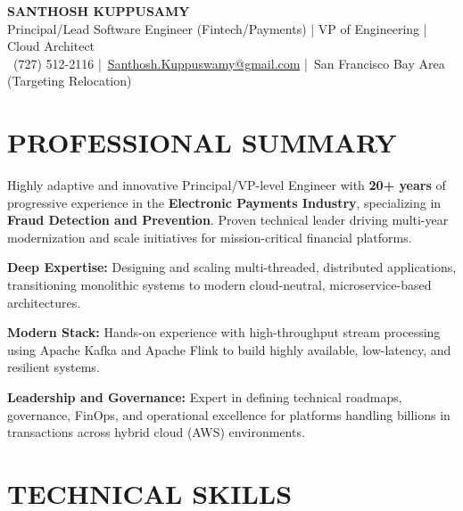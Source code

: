 \documentclass[10pt,letterpaper]{article}
\newcommand{\resumeheader}[5]{
  \begin{center}
    {\Huge\bfseries\color{headercolor}#1}\\[4pt]
    {\large\color{gray}#2}\\[6pt]
    \small
    \faPhone\ #3 \quad|\quad \faEnvelope\ \href{mailto:#4}{#4} \quad|\quad \faMapMarker*\ #5
  \end{center}
  \vspace{-8pt}
}
\begin{document}
\resumeheader
  {SANTHOSH KUPPUSAMY}
  {Principal/Lead Software Engineer (Fintech/Payments) | VP of Engineering | Cloud Architect}
  {(727) 512-2116}
  {Santhosh.Kuppuswamy@gmail.com}
  {San Francisco Bay Area (Targeting Relocation)}

\vspace{-6pt}

\section*{PROFESSIONAL SUMMARY}
\small
Highly adaptive and innovative Principal/VP-level Engineer with \textbf{20+ years} of progressive experience in the \textbf{Electronic Payments Industry}, specializing in \textbf{Fraud Detection and Prevention}. Proven technical leader driving multi-year modernization and scale initiatives for mission-critical financial platforms.

\vspace{4pt}
\textbf{Deep Expertise:} Designing and scaling multi-threaded, distributed applications, transitioning monolithic systems to modern cloud-neutral, microservice-based architectures.

\vspace{2pt}
\textbf{Modern Stack:} Hands-on experience with high-throughput stream processing using Apache Kafka and Apache Flink to build highly available, low-latency, and resilient systems.

\vspace{2pt}
\textbf{Leadership and Governance:} Expert in defining technical roadmaps, governance, FinOps, and operational excellence for platforms handling billions in transactions across hybrid cloud (AWS) environments.

\vspace{2pt}

\section*{TECHNICAL SKILLS}
\end{document}
